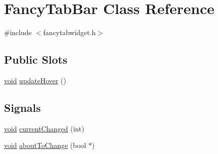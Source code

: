 \hypertarget{class_fancy_tab_bar}{\section{\-Fancy\-Tab\-Bar \-Class \-Reference}
\label{class_fancy_tab_bar}
}


{\ttfamily \#include $<$fancytabwidget.\-h$>$}

\subsection*{\-Public \-Slots}
\begin{DoxyCompactItemize}
\item 
\hyperlink{group___u_a_v_objects_plugin_ga444cf2ff3f0ecbe028adce838d373f5c}{void} \hyperlink{group___core_plugin_gaebba5e848c986c159a23e73619bb0fa8}{update\-Hover} ()
\end{DoxyCompactItemize}
\subsection*{\-Signals}
\begin{DoxyCompactItemize}
\item 
\hyperlink{group___u_a_v_objects_plugin_ga444cf2ff3f0ecbe028adce838d373f5c}{void} \hyperlink{group___core_plugin_gab01320f8d84813aa496591d543e25d22}{current\-Changed} (int)
\item 
\hyperlink{group___u_a_v_objects_plugin_ga444cf2ff3f0ecbe028adce838d373f5c}{void} \hyperlink{group___core_plugin_ga5f3214f2d2395c7aa4e95740fe71e711}{about\-To\-Change} (bool $\ast$)
\end{DoxyCompactItemize}
